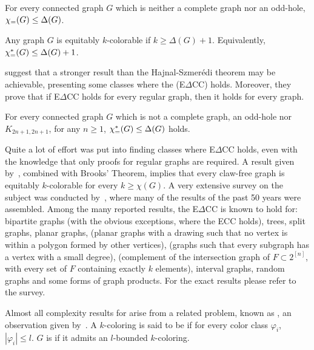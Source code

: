 \begin{conjecture*}[ECC]
    For every connected graph $G$ which is neither a complete graph nor an odd-hole, $\chi_{\mathcal{=}}(G) \leq \Delta(G)$.
\end{conjecture*}

\begin{theorem*}
    Any graph $G$ is equitably $k$-colorable if $k \geq \Delta(G) + 1$. Equivalently, $\chi_{\mathcal{=}}^*(G) \leq \Delta(G) + 1$.
\end{theorem*}

\cite{e_delta_cc} suggest that a stronger result than the Hajnal-Szmerédi theorem may be achievable, presenting some classes where the  (E$\Delta$CC) holds.
Moreover, they prove that if E$\Delta$CC holds for every regular graph, then it holds for every graph.

\begin{conjecture*}[E$\Delta$CC]
    For every connected graph $G$ which is not a complete graph, an odd-hole nor $K_{2n+1, 2n+1}$, for any $n \geq 1$, $\chi_{\mathcal{=}}^*(G) \leq \Delta(G)$ holds.
\end{conjecture*}

Quite a lot of effort was put into finding classes where E$\Delta$CC holds, even with the knowledge that only proofs for regular graphs are required.
A result given by~\cite{claw_free_de_werra}, combined with Brooks' Theorem, implies that every claw-free graph is equitably $k$-colorable for every $k \geq \chi(G)$.
A very extensive survey on the subject was conducted by~\cite{equitable_survey}, where many of the results of the past 50 years were assembled.
Among the many reported results, the E$\Delta$CC is known to hold for:
bipartite graphs (with the obvious exceptions, where the ECC holds),
trees,
split graphs,
planar graphs,
 (planar graphs with a drawing such that no vertex is within a polygon formed by other vertices),
 (graphs such that every subgraph has a vertex with a small degree),
 (complement of the intersection graph of $F \subset 2^{[n]}$, with every set of $F$ containing exactly $k$ elements),
interval graphs,
random graphs and
some forms of graph products.
For the exact results please refer to the survey.

Almost all complexity results for  arise from a related problem, known as , an observation given by~\cite{equitable_treewidth}.
A $k$-coloring is said to be  if for every color class $\varphi_i$, $|\varphi_i| \leq l$.
$G$ is  if it admits an $l$-bounded $k$-coloring.

